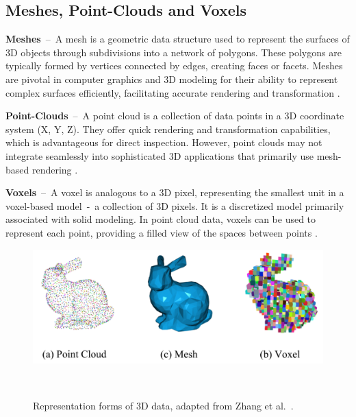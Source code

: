 \subsection{Meshes, Point-Clouds and Voxels}\label{MPCV}

\textbf{Meshes}~--~A mesh is a geometric data structure used to represent the surfaces of 3D objects through subdivisions into a network of polygons. These polygons are typically formed by vertices connected by edges, creating faces or facets. Meshes are pivotal in computer graphics and 3D modeling for their ability to represent complex surfaces efficiently, facilitating accurate rendering and transformation \citep{lahav2020meshwalker, Zhang_2023}.

\textbf{Point-Clouds}~--~A point cloud is a collection of data points in a 3D coordinate system (X, Y, Z). They offer quick rendering and transformation capabilities, which is advantageous for direct inspection. However, point clouds may not integrate seamlessly into sophisticated 3D applications that primarily use mesh-based rendering \citep{voxels, Zhang_2023}.

\textbf{Voxels}~--~A voxel is analogous to a 3D pixel, representing the smallest unit in a voxel-based model~-~a collection of 3D pixels. It is a discretized model primarily associated with solid modeling. In point cloud data, voxels can be used to represent each point, providing a filled view of the spaces between points \citep{voxels, Zhang_2023}.

\begin{figure}[H]
    \centering
      \includegraphics[width=.8\columnwidth]{figures/mpcv.png}
      \caption{Representation forms of 3D data, adapted from Zhang et al.~\citep{Zhang_2023}.}~\label{fig:mpcv}
\end{figure}